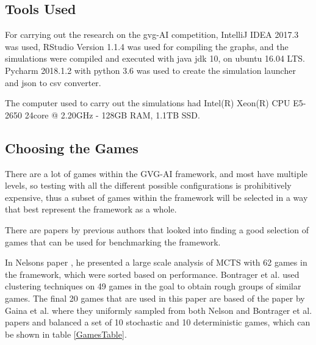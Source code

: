 \documentclass[journal]{IEEEtran}
\begin{document}

	\subsection{Tools Used}
	For carrying out the research on the gvg-AI competition, IntelliJ IDEA 2017.3 was used, RStudio Version 1.1.4 was used for compiling the graphs, and the simulations were compiled and executed with java jdk 10, on ubuntu 16.04 LTS.
	Pycharm 2018.1.2 with python 3.6 was used to create the simulation launcher and json to csv converter.
	
	The computer used to carry out the simulations had Intel(R) Xeon(R) CPU E5-2650 24core @ 2.20GHz - 128GB RAM, 1.1TB SSD.

	\subsection{Choosing the Games}
	
	There are a lot of games within the GVG-AI framework, and most have multiple levels, so testing with all the different possible configurations is prohibitively expensive, thus a subset of games within the framework will be selected in a way that best represent the framework as a whole.
	
	There are papers by previous authors that looked into finding a good selection of games that can be used for benchmarking the framework. \cite{gaina2017population}
	
	In Nelsons paper \cite{nelson2016investigating}, he presented a large scale analysis of MCTS with 62 games in the framework, which were sorted based on performance. Bontrager et al. \cite{bontrager2016matching} used clustering techniques on 49 games in the goal to obtain rough groups of similar games.
	The final 20 games that are used in this paper are based of the paper by Gaina et al. \cite{gaina2017population} where they uniformly sampled from both Nelson and Bontrager et al. papers and balanced a set of 10 stochastic and 10 deterministic games, which can be shown in table \ref{GamesTable}.
	
\end{document}
